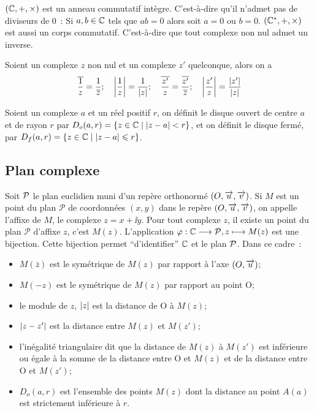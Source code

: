 \begin{prop}
  \((\C, + ,\times)\) est un anneau commutatif intègre. C'est-à-dire qu'il
  n'admet pas de diviseurs de 0~: Si \(a, b \in{}\C\) tels que \(ab = 0\) alors
  soit \(a = 0\) ou \(b = 0\).
  \((\C^*, + ,\times)\) est aussi un corps commutatif. C'est-à-dire que tout
  complexe non nul admet un inverse.
\end{prop}

\begin{prop}
  Soient un complexe \(z\) non nul et un complexe \(z'\) quelconque, alors on
  a
  \begin{equation}
    \bar{\frac{1}{z}} = \frac{1}{\bar{z}}; \quad \abs{\frac{1}{z}} =
    \frac{1}{\abs{z}}; \quad
    \bar{\frac{z'}{z}} = \frac{\bar{z'}}{\bar{z}}; \quad \abs{\frac{z'}{z}}
    = \frac{\abs{z'}}{\abs{z}}
  \end{equation}
\end{prop}

\begin{defdef}
  Soient un complexe \(a\) et un réel positif \(r\), on définit le disque
  ouvert de centre \(a\) et de rayon \(r\) par \(D_o(a,r) =
  \enstq{z\in\C}{\abs{z-a}<r}\), et on définit le disque fermé, par \(D_f(a,r)
  = \enstq{z\in\C}{\abs{z-a}\leqslant r}\).
\end{defdef}

\subsection{Plan complexe}\label{subsec:plancomplexe}

Soit \(\P\) le plan euclidien muni d'un repère orthonormé \((O,\vect{u},
\vect{v})\). Si \(M\) est un point du plan \(\mathcal{P}\) de coordonnées
\((x,y)\) dans le repère \((O,\vect{u}, \vect{v})\), on appelle l'affixe de
\(M\), le complexe \(z = x + \ii{}y\). Pour tout complexe \(z\), il existe un
point du plan \(\mathcal{P}\) d'affixe \(z\), c'est \(M(z)\). L'application
\(\fonctionL{\varphi}{\C}{\P}{z}{M(z)}\) est une bijection. Cette bijection
permet ``d'identifier'' \(\C\) et le plan \(\P\). Dans ce cadre~:

\begin{itemize}
  \item \(M(\bar{z})\) est le symétrique de \(M(z)\) par rapport à l'axe
    \((O,\vect{u})\);
  \item \(M(-z)\) est le symétrique de \(M(z)\) par rapport au point O\@;
  \item le module de \(z\), \(\abs{z}\) est la distance de O à \(M(z)\);
  \item \(\abs{z-z'}\) est la distance entre \(M(z)\) et \(M(z')\);
  \item l'inégalité triangulaire dit que la distance de \(M(z)\) à \(M(z')\)
    est inférieure ou égale à la somme de la distance entre O et \(M(z)\) et
    de la distance entre O et \(M(z')\);
  \item \(D_o(a,r)\) est l'ensemble des points \(M(z)\) dont la distance au
    point \(A(a)\) est strictement inférieure à \(r\).
\end{itemize}

